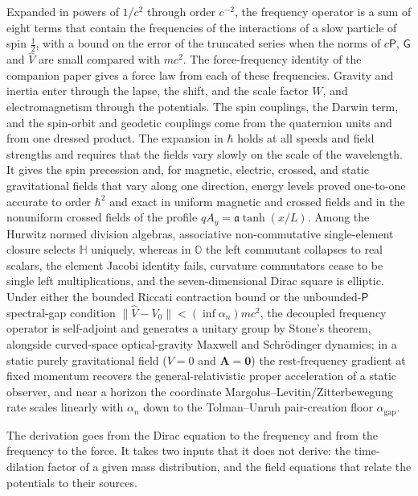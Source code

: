 \documentclass[aps,prd,onecolumn,tightenlines,nofootinbib,notitlepage,11pt,floatfix]{revtex4-2}
\theoremstyle{indentedtheorem}
\begin{document}
Expanded in powers of $1/c^2$ through order $c^{-2}$, the frequency operator is a sum of eight terms that contain the frequencies of the interactions of a slow particle of spin $\tfrac{1}{2}$, with a bound on the error of the truncated series when the norms of $c\mathsf{P}$, $\mathsf{G}$ and $\hat{V}$ are small compared with $mc^2$. The force-frequency identity of the companion paper gives a force law from each of these frequencies. Gravity and inertia enter through the lapse, the shift, and the scale factor $W$, and electromagnetism through the potentials. The spin couplings, the Darwin term, and the spin-orbit and geodetic couplings come from the quaternion units and from one dressed product. The expansion in $\hbar$ holds at all speeds and field strengths and requires that the fields vary slowly on the scale of the wavelength. It gives the spin precession and, for magnetic, electric, crossed, and static gravitational fields that vary along one direction, energy levels proved one-to-one accurate to order $\hbar^2$ and exact in uniform magnetic and crossed fields and in the nonuniform crossed fields of the profile $qA_y=\mathfrak{a}\tanh(x/L)$. Among the Hurwitz normed division algebras, associative non-commutative single-element closure selects $\mathbb{H}$ uniquely, whereas in $\mathbb{O}$ the left commutant collapses to real scalars, the element Jacobi identity fails, curvature commutators cease to be single left multiplications, and the seven-dimensional Dirac square is elliptic. Under either the bounded Riccati contraction bound or the unbounded-$\mathsf{P}$ spectral-gap condition $\|\hat{V}-V_0\|<(\inf\alpha_n)mc^2$, the decoupled frequency operator is self-adjoint and generates a unitary group by Stone's theorem, alongside curved-space optical-gravity Maxwell and Schr\"odinger dynamics; in a static purely gravitational field ($V=0$ and $\mathbf{A}=\mathbf{0}$) the rest-frequency gradient at fixed momentum recovers the general-relativistic proper acceleration of a static observer, and near a horizon the coordinate Margolus--Levitin/Zitterbewegung rate scales linearly with $\alpha_n$ down to the Tolman--Unruh pair-creation floor $\alpha_\text{gap}$.

The derivation goes from the Dirac equation to the frequency and from the frequency to the force. It takes two inputs that it does not derive: the time-dilation factor of a given mass distribution, and the field equations that relate the potentials to their sources.

\appendix
\end{document}
